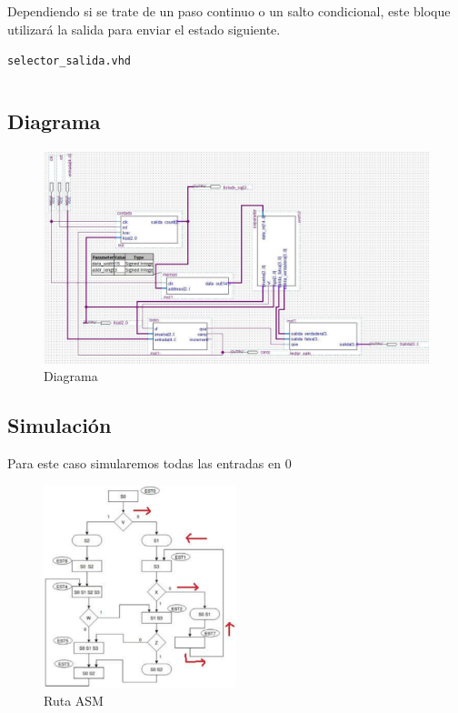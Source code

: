 \documentclass[table]{scrartcl}
\newenvironment{code}{\captionsetup{type=listing}}{}
\begin{document}
Dependiendo si se trate de un paso continuo o un salto condicional, este bloque
utilizará la salida para enviar el estado siguiente.
\begin{code}
  \caption{\texttt{selector_salida.vhd}}
  \inputminted{vhdl}{./selector_salida.vhd}
\end{code}

\subsection{Diagrama}\label{sec:diagrama}
\begin{figure}[H]
    \centering
    \includegraphics[width=\textwidth]{./img/dia}
    \caption{Diagrama}
\end{figure}

\newpage{}

\subsection{Simulación}\label{sec:simulacion}
Para este caso simularemos todas las entradas en $0$
\begin{figure}[H]
  \centering
    \includegraphics[width=0.5\textwidth]{./img/ruta_asm}
  \caption{Ruta ASM}\label{fig:ruta}
\end{figure}
\end{document}
